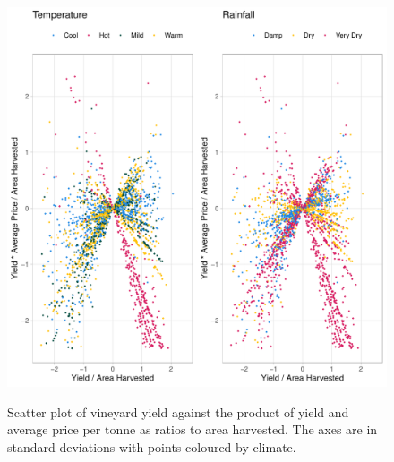 \documentclass[review,12pt,authoryear]{elsarticle}
\begin{document}
\begin{linenumbers}
\begin{figure}
{  \includegraphics{yield_verse_value_by_area.pdf}}
    \caption{Scatter plot of vineyard yield against the product of yield and average price per tonne as ratios to area harvested. The axes are in standard deviations with points coloured by climate.}
\end{figure}
%
\begin{figure}\label{fig:map}

\end{figure}
\end{linenumbers}
\end{document}
